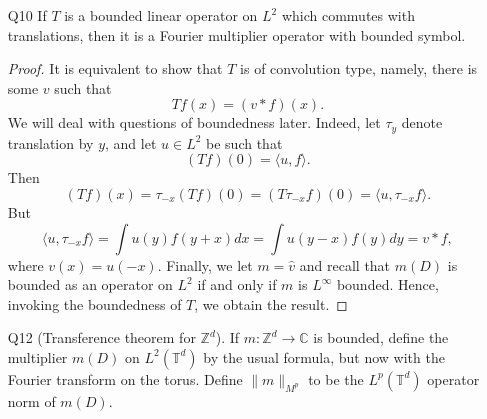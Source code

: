 \documentclass[11pt]{article}
\newtheorem*{claim}{Claim}
\theoremstyle{remark}
\newcommand{\1}{\textbf{1}}
\newcommand{\lle}{\lesssim}
\def\norm#1{\| #1  \|}
\newcommand{\bbZ}{\mathbb{Z}}
\newcommand{\bbT}{\mathbb{T}}
\newcommand{\bbC}{\mathbb{C}}
\begin{document}
\begin{enumerate}
\begin{claim}
\[
|\{Mf \geq K\lambda \textup{ and } f^\sharp \leq \epsilon \lambda \} | \lle_d \frac{\epsilon}{K} |\{ Mf \geq \lambda\}|
\]
\begin{proof}
We may assume the right hand side (denote it by $E_\lambda$) has finite measure, otherwise there is nothing to prove. Cover $E_\lambda$ by balls $B \in\mathcal{B} \subset 100 \{ Mf \geq \lambda \}$ and by the Vitali covering theorem, we can extract a finite subcover $B_j$ such that 
\[
\bigcup_{B \in \mathcal{B}} B \subset \bigcup_j 5 B_j.
\]
If $j$ is such that $f^\sharp(x) \gtrsim \epsilon \lambda$ for all $\epsilon > 0$ then we may ignore it, and if not, we apply the previous result to obtain
\[
|\{Mf \geq K\lambda \textup{ and } f^\sharp \leq \epsilon \lambda \} |  \lle_d \sum_{j} |\{x \in B_j : Mf \geq K\lambda \} | \lle_d \frac{\epsilon}{K} \sum_j |B_j|.
\]
and the result follows. 
\end{proof}
\end{claim}
\item[Q10] If $T$ is a bounded linear operator on $L^2$ which commutes with translations, then it is a Fourier multiplier operator with bounded symbol.
\begin{proof}
It is equivalent to show that $T$ is of convolution type, namely, there is some $v$ such that
\[
Tf (x) = (v*f)(x).
\]
We will deal with questions of boundedness later. Indeed, let $\tau_y$ denote translation by $y$, and let $u \in L^2$ be such that
\[
(Tf)(0) = \langle u , f \rangle.
\]
Then
\[
(Tf)(x) = \tau_{-x} (Tf)(0) =  (T \tau_{-x}f)(0) = \langle u , \tau_{-x} f \rangle.
\]
But
\[
\langle u , \tau_{-x} f \rangle = \int u(y) f(y+x) dx = \int u(y-x) f(y) dy = v * f,
\]
where $v(x) = u(-x)$. Finally, we let $m = \hat{v}$ and recall that $m(D)$ is bounded as an operator on $L^2$ if and only if $m$ is $L^\infty$ bounded. Hence, invoking the boundedness of $T$, we obtain the result.
\end{proof}
\item[Q12] (Transference theorem for $\bbZ^d$). If $m: \bbZ^d \to \bbC$ is bounded, define the multiplier $m(D)$ on $L^2(\bbT^d)$ by the usual formula, but now with the Fourier transform on the torus. Define $\norm{m}_{M^p}$ to be the $L^p(\bbT^d)$ operator norm of $m(D)$.


\end{enumerate}
\end{document}
